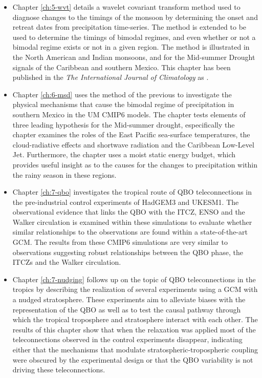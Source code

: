 \begin{itemize}
\item Chapter \ref{ch:5-wvt} details a wavelet covariant transform method used to diagnose changes to the timings of the monsoon by determining the onset and retreat dates from precipitation time-series. The method is extended to be used to determine the timings of bimodal regimes, and even whether or not a bimodal regime exists or not in a given region. The method is illustrated in the North American and Indian monsoons, and for the Mid-summer Drought signals of the Caribbean and southern Mexico. This chapter has been published in the \textit{The International Journal of Climatology} as \cite{garciafranco2021}.
\item Chapter \ref{ch:6-msd} uses the method of the previous to investigate the physical mechanisms that cause the bimodal regime of precipitation in southern Mexico in the UM CMIP6 models. The chapter tests elements of three leading hypothesis for the Mid-summer drought, especifically the chapter examines the roles of the East Pacific sea-surface temperatures, the cloud-radiative effects and shortwave radiation and the Caribbean Low-Level Jet. Furthermore, the chapter uses a moist static energy budget, which provides useful insight as to the causes for the changes to precipitation within the rainy season in these regions.
\item Chapter \ref{ch:7-qbo} investigates the tropical route of QBO teleconnections in the pre-industrial control experiments of HadGEM3 and UKESM1.
The observational evidence that links the QBO with the ITCZ, ENSO and the Walker circulation is examined within these simulations to evaluate whether similar relationships to the observations are found within a state-of-the-art GCM. 
The results from these CMIP6 simulations are very similar to observations suggesting robust relationships between the QBO phase, the ITCZs and the Walker circulation.
\item Chapter \ref{ch:7-nudging} follows up on the topic of QBO teleconnections in the tropics by describing the realization of several experiments using a GCM with a nudged stratosphere. These experiments aim to alleviate biases with the representation of the QBO as well as to test the causal pathway through which the tropical troposphere and stratosphere interact with each other. 
The results of this chapter show that when the relaxation was applied most of the teleconnections observed in the control experiments disappear, indicating either that the mechanisms that modulate stratospheric-tropospheric coupling were obscured by the experimental design or that the QBO variability is not driving these teleconnections.
\end{itemize}